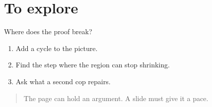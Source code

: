 \documentclass[aspectratio=169,12pt]{beamer}
\begin{document}
\section{To explore}
\begin{frame}{Where does the proof break?}
  \begin{enumerate}
    \item Add a cycle to the picture.
    \item Find the step where the region can stop shrinking.
    \item Ask what a second cop repairs.
  \end{enumerate}
  \bigskip
  \begin{quote}
    The page can hold an argument. A slide must give it a pace.
  \end{quote}
\end{frame}
\end{document}
